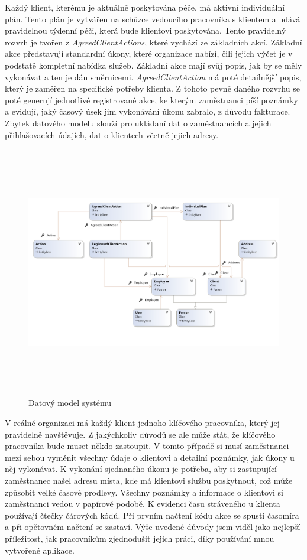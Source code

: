 \documentclass[
  biblatex,
  glossaries,
  index
]{kidiplom}
\begin{document}
Každý klient, kterému je aktuálně poskytována péče, má aktivní individuální plán. Tento plán je vytvářen na schůzce vedoucího pracovníka s klientem a udává pravidelnou týdenní péči, která bude klientovi poskytována. Tento pravidelný rozvrh je tvořen z \textit{AgreedClientActions}, které vychází ze základních akcí. Základní akce představují  standardní úkony, které organizace nabízí, čili jejich výčet je v podstatě kompletní nabídka služeb. Základní akce mají svůj popis, jak by se měly vykonávat a ten je dán směrnicemi. \textit{AgreedClientAction} má poté detailnější popis, který je zaměřen na specifické potřeby klienta. Z tohoto pevně daného rozvrhu se poté generují jednotlivé registrované akce, ke kterým zaměstnanci píší poznámky a evidují, jaký časový úsek jim vykonávání úkonu zabralo, z důvodu fakturace. Zbytek datového modelu slouží pro ukládaní dat o zaměstnancích a jejich přihlašovacích údajích, dat o klientech včetně jejich adresy. 

\begin{figure}[H]
  	\centering
 	 \includegraphics[width=14cm,height=11cm]{datamodel}
 	 \caption{Datový model systému}
 	 \label{fig:dataModel}
\end{figure}

 V reálné organizaci má každý klient jednoho klíčového pracovníka, který jej pravidelně navštěvuje. Z jakýchkoliv důvodů se ale může stát, že klíčového pracovníka bude muset někdo zastoupit. V tomto případě si musí zaměstnanci mezi sebou vyměnit všechny údaje o klientovi a detailní poznámky, jak úkony u něj vykonávat. K vykonání sjednaného úkonu je potřeba, aby si zastupující zaměstnanec našel adresu místa, kde má klientovi službu poskytnout, což může způsobit velké časové prodlevy. Všechny poznámky a informace o klientovi si zaměstnanci vedou v papírové podobě. K evidenci času stráveného u klienta používají čtečky čárových kódů. Při prvním načtení kódu akce se spustí časomíra a při opětovném načtení se zastaví. Výše uvedené důvody jsem viděl jako nejlepší příležitost, jak pracovníkům zjednodušit jejich práci, díky používání mnou vytvořené aplikace. 
\newpage
\end{document}
